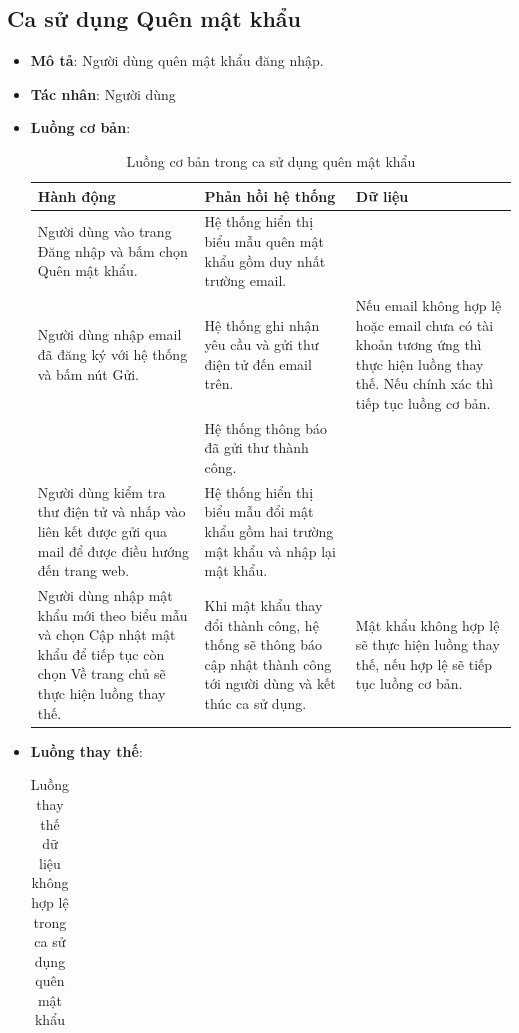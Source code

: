 \documentclass[./../main.tex]{subfiles}
\begin{document}
\subsection{Ca sử dụng Quên mật khẩu}
\begin{itemize}
    \item \textbf{Mô tả}: Người dùng quên mật khẩu đăng nhập.
    \item \textbf{Tác nhân}: Người dùng
    \item \textbf{Luồng cơ bản}:
    \begin{table}[H]
    \caption{\label{uc-7}Luồng cơ bản trong ca sử dụng quên mật khẩu}
    \begin{tabularx}{\textwidth}{| X | X | X |}
        \hline
        \textbf{Hành động} & \textbf{Phản hồi hệ thống} & \textbf{Dữ liệu} \\ \hline
        Người dùng vào trang Đăng nhập và bấm chọn Quên mật khẩu. & Hệ thống hiển thị biểu mẫu quên mật khẩu gồm duy nhất trường email. &
        \\ \hline
        Người dùng nhập email đã đăng ký với hệ thống và bấm nút Gửi. & Hệ thống ghi nhận yêu cầu và gửi thư điện tử đến email trên. & Nếu email không hợp lệ hoặc email chưa có tài khoản tương ứng thì thực hiện luồng thay thế. Nếu chính xác thì tiếp tục luồng cơ bản.
        \\ \hline
        & Hệ thống thông báo đã gửi thư thành công. &
        \\ \hline
        Người dùng kiểm tra thư điện tử và nhấp vào liên kết được gửi qua mail để được điều hướng đến trang web. & Hệ thống hiển thị biểu mẫu đổi mật khẩu gồm hai trường mật khẩu và nhập lại mật khẩu. &
        \\ \hline
        Người dùng nhập mật khẩu mới theo biểu mẫu và chọn Cập nhật mật khẩu để tiếp tục còn chọn Về trang chủ sẽ thực hiện luồng thay thế. & Khi mật khẩu thay đổi thành công, hệ thống sẽ thông báo cập nhật thành công tới người dùng và kết thúc ca sử dụng. & Mật khẩu không hợp lệ sẽ thực hiện luồng thay thế, nếu hợp lệ sẽ tiếp tục luồng cơ bản.
        \\ \hline
    \end{tabularx}
    \end{table}    
    \item \textbf{Luồng thay thế}:
        \begin{table}[H]
        \caption{\label{uc-8}Luồng thay thế dữ liệu không hợp lệ trong ca sử dụng quên mật khẩu}
        \begin{tabularx}{\textwidth}{| X | X | X |}

\end{tabularx}
\end{table}
\end{itemize}
\end{document}
